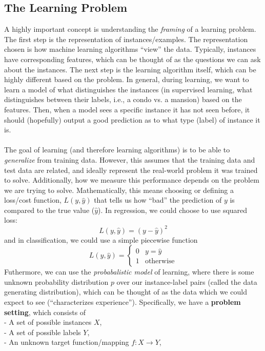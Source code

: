 \documentclass[11 pt]{scrartcl}
\begin{document}
\subsection{The Learning Problem}
A highly important concept is understanding the \textit{framing} of a learning problem. The first step is the representation of instances/examples. The representation chosen is how machine learning algorithms ``view'' the data. Typically, instances have corresponding features, which can be thought of as the questions we can ask about the instances. The next step is the learning algorithm itself, which can be highly different based on the problem. In general, during learning, we want to learn a model of what distinguishes the instances (in supervised learning, what distinguishes between their labels, i.e., a condo vs. a mansion) based on the features. Then, when a model sees a specific instance it has not seen before, it should (hopefully) output a good prediction as to what type (label) of instance it is. \\\\
The goal of learning (and therefore learning algorithms) is to be able to \textit{generalize} from training data. However, this assumes that the training data and test data are related, and ideally represent the real-world problem it was trained to solve. Additionally, how we measure this performance depends on the problem we are trying to solve. Mathematically, this means choosing or defining a loss/cost function, $L(y, \hat{y})$ that tells us how ``bad'' the prediction of $y$ is compared to the true value ($\hat{y}$). In regression, we could choose to use squared loss:
$$
L(y, \hat{y}) = (y - \hat{y})^2
$$
and in classification, we could use a simple piecewise function
$$
L(y, \hat{y}) = 
\begin{cases} 
      0 & y = \hat{y} \\
      1 & \text{otherwise}
\end{cases}
$$
Futhermore, we can use the \textit{probabalistic model} of learning, where there is some unknown probability distribution $p$ over our instance-label pairs (called the data generating distribution), which can be thought of as the data which we could expect to see (``characterizes experience''). \newpage Specifically, we have a \textbf{problem setting}, which consists of \\
- A set of possible instances $X$, \\
- A set of possible labels $Y$, \\
- An unknown target function/mapping $f: X \rightarrow Y$, \\ 
\end{document}
